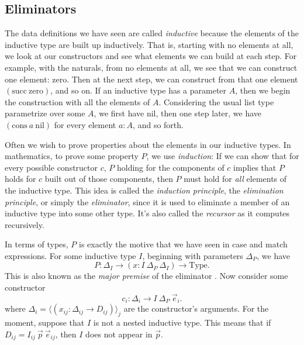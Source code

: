 \documentclass{report}
\newcommand{\zero}{\const{zero}}
\renewcommand{\succ}{\const{succ}}
\newcommand{\nil}{\const{nil}}
\newcommand{\cons}{\const{cons}}
\newcommand{\const}[1]{\text{#1}}
\newcommand{\Type}{\const{Type}}
\begin{document}
\subsection{Eliminators}

The data definitions we have seen are called \emph{inductive} because the elements of the inductive type are built up inductively. That is, starting with no elements at all, we look at our constructors and see what elements we can build at each step. For example, with the naturals, from no elements at all, we see that we can construct one element: $\zero$. Then at the next step, we can construct from that one element $(\succ ~ \zero)$, and so on. If an inductive type has a parameter $A$, then we begin the construction with all the elements of $A$. Considering the usual list type parametrize over some $A$, we first have $\nil$, then one step later, we have $(\cons ~ a ~ \nil)$ for every element $a : A$, and so forth.

Often we wish to prove properties about the elements in our inductive types. In mathematics, to prove some property $P$, we use \emph{induction}: If we can show that for every possible constructor $c$, $P$ holding for the components of $c$ implies that $P$ holds for $c$ built out of those components, then $P$ must hold for \emph{all} elements of the inductive type. This idea is called the \emph{induction principle}, the \emph{elimination principle}, or simply the \emph{eliminator}, since it is used to eliminate a member of an inductive type into some other type. It's also called the \emph{recursor} as it computes recursively.

In terms of types, $P$ is exactly the motive that we have seen in case and match expressions. For some inductive type $I$, beginning with parameters $\Delta_P$, we have $$P : \Delta_I \to (x : I ~ \Delta_P ~ \Delta_I) \to \Type.$$ This is also known as the \emph{major premise} of the eliminator \citep{inductive-families}. Now consider some constructor $$c_i : \Delta_{i} \to I ~ \Delta_P ~ \Vec{e}_i.$$ where $\Delta_i = \langle (x_{ij} : \Delta_{ij} \to D_{ij}) \rangle_j$ are the constructor's arguments. For the moment, suppose that $I$ is not a nested inductive type. This means that if $D_{ij} = I_{ij} ~ \Vec{p} ~ \Vec{e}_{ij}$, then $I$ does not appear in $\Vec{p}$.
\end{document}
